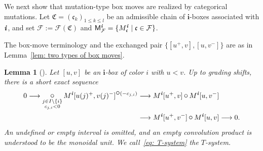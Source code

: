 \documentclass[12pt, leqno]{amsart}
\numberwithin{equation}{section}
\theoremstyle{plain}
\newtheorem{lemma}{Lemma}[section]
\theoremstyle{definition}
\newcommand{\seteq}{\mathbin{:=}}
\newcommand{\conv}{\mathop{\mathbin{\mbox{\large $\circ$}}}}
\newcommand{\ii}{ \textbf{\textit{i}}}
\newcommand{\frakC}{\mathfrak{C}}
\newcommand{\frakc}{\mathfrak{c}}
\newcommand{\sfM}{\mathsf{M}}
\newcommand{\bfi}{\mathbf{i}}
\newcommand{\calF}{\mathcal{F}}
\begin{document}
 We next show that mutation-type box moves are realized
by categorical mutations.  Let
$\frakC=(\frakc_k)_{1\leq k\leq l}$
be an admissible chain of \(\bfi\)-boxes associated with \(\ii\),
and set
$\calF\seteq\calF(\frakC)$
and
$\sfM^\ii_\calF = \{M_\frakc^\ii\mid\frakc\in\calF\}$.


The box-move terminology and the exchanged pair
\(\{[u^+,v],[u,v^-]\}\) are as in
Lemma~\ref{lem: two types of box moves}.

\begin{lemma}[{\cite[Proposition~5.2]{KK24}}]
\label{lem: box T-system}
 Let \([u,v]\) be an \(\bfi\)-box of color \(i\) with \(u<v\).  Up to grading
shifts, there is a short exact sequence 
\begin{equation} \label{eq: T-system}
\begin{aligned}
0\longrightarrow
\mathop{\conv}_{\substack{j\in I\setminus\{i\}\\c_{j,i}<0}}
M^\ii[u(j)^+,v(j)^-]^{\conv(-c_{j,i})}
& \longrightarrow 
M^\ii[u^+,v]\conv M^\ii[u,v^-] \\
& \longrightarrow
M^\ii[u^+,v^-]\conv M^\ii[u,v]
\longrightarrow0.    
\end{aligned}
\end{equation}
An undefined or empty interval is omitted, and an empty convolution
product is understood to be the monoidal unit. We call~\eqref{eq: T-system} the \emph{\(T\)-system}. 
\end{lemma}
\end{document}
